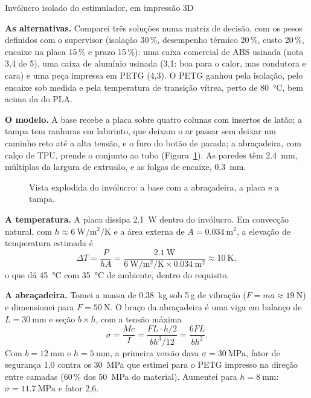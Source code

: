 \begin{atividade}{Invólucro isolado do estimulador, em impressão 3D}
\begin{desenvolvimento}
\textbf{As alternativas.} Comparei três soluções numa matriz de decisão, com os pesos definidos com o
supervisor (isolação 30\,\%, desempenho térmico 20\,\%, custo 20\,\%, encaixe na placa
15\,\% e prazo 15\,\%): uma caixa comercial de ABS usinada (nota 3,4 de 5), uma caixa de alumínio
usinada (3,1: boa para o calor, mas condutora e cara) e uma peça impressa em PETG (4,3). O PETG
ganhou pela isolação, pelo encaixe sob medida e pela temperatura de transição vítrea, perto de
\SI{80}{\celsius}, bem acima da do PLA.

\textbf{O modelo.} A base recebe a placa sobre quatro colunas com insertos de latão; a tampa tem
ranhuras em labirinto, que deixam o ar passar sem deixar um caminho reto até a alta tensão, e o furo
do botão de parada; a abraçadeira, com calço de TPU, prende o conjunto ao tubo
(Figura~\ref{fig:ex-involucro}). As paredes têm \SI{2,4}{\milli\meter}, múltiplas da largura de
extrusão, e as folgas de encaixe, \SI{0,3}{\milli\meter}.

\begin{figure}[htbp]
  \centering
  
  \caption{Vista explodida do invólucro: a base com a abraçadeira, a placa e a tampa.}
  \label{fig:ex-involucro}
\end{figure}

\textbf{A temperatura.} A placa dissipa \SI{2,1}{\watt} dentro do invólucro. Em convecção natural,
com $h \approx \SI{6}{\watt\per\square\meter\per\kelvin}$ e a área externa de
$A = \SI{0,034}{\square\meter}$, a elevação de temperatura estimada é
\begin{equation}
  \Delta T = \frac{P}{h A} = \frac{\SI{2,1}{\watt}}{\SI{6}{\watt\per\square\meter\per\kelvin} \times \SI{0,034}{\square\meter}} \approx \SI{10}{\kelvin},
  \label{eq:ex-termico}
\end{equation}
o que dá \SI{45}{\celsius} com \SI{35}{\celsius} de ambiente, dentro do requisito.

\textbf{A abraçadeira.} Tomei a massa de \SI{0,38}{\kilo\gram} sob 5\,g de vibração
($F = m a \approx \SI{19}{\newton}$) e dimensionei para $F = \SI{50}{\newton}$. O braço da abraçadeira
é uma viga em balanço de $L = \SI{30}{\milli\meter}$ e seção $b \times h$, com a tensão máxima
\begin{equation}
  \sigma = \frac{M c}{I} = \frac{F L \cdot h/2}{b h^3/12} = \frac{6 F L}{b h^2}.
  \label{eq:ex-viga}
\end{equation}
Com $b = \SI{12}{\milli\meter}$ e $h = \SI{5}{\milli\meter}$, a primeira versão dava
$\sigma = \SI{30}{\mega\pascal}$, fator de segurança 1,0 contra os \SI{30}{\mega\pascal} que
estimei para o PETG impresso na direção entre camadas (60\,\% dos \SI{50}{\mega\pascal} do material).
Aumentei para $h = \SI{8}{\milli\meter}$: $\sigma = \SI{11,7}{\mega\pascal}$ e fator 2,6.
\end{desenvolvimento}


\end{atividade}
